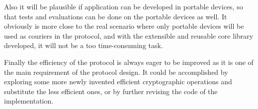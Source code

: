 Also it will be plausible if application can be developed in portable devices, so that tests and evaluations can be done on the portable devices as well. It obviously is more close to the real scenario where only portable devices will be used as couriers in the protocol, and with the extensible and reusable core library developed, it will not be a too time-consuming task.

Finally the efficiency of the protocol is always eager to be improved as it is one of the main requirement of the protocol design. It could be accomplished by exploring some more newly invented efficient cryptographic operations and substitute the less efficient ones, or by further revising the code of the implementation.